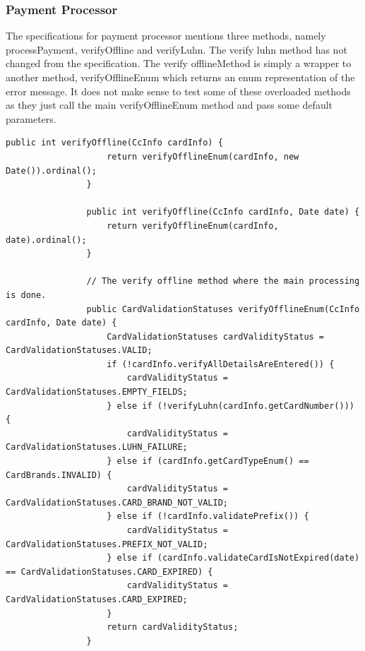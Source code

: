 \documentclass[11pt, a4paper]{article}
\begin{document}
        \subsubsection{Payment Processor}
            The specifications for payment processor mentions three methods, namely processPayment, verifyOffline and verifyLuhn. The verify luhn method has not changed from the specification. The verify offlineMethod is simply a wrapper to another method, verifyOfflineEnum which returns an enum representation of the error message. It does not make sense to test some of these overloaded methods as they just call the main verifyOfflineEnum method and pass some default parameters.
            \begin{lstlisting}[caption=Verify offline overloaded methods]
                public int verifyOffline(CcInfo cardInfo) {
                    return verifyOfflineEnum(cardInfo, new Date()).ordinal();
                }

                public int verifyOffline(CcInfo cardInfo, Date date) {
                    return verifyOfflineEnum(cardInfo, date).ordinal();
                }

                // The verify offline method where the main processing is done.
                public CardValidationStatuses verifyOfflineEnum(CcInfo cardInfo, Date date) {
                    CardValidationStatuses cardValidityStatus = CardValidationStatuses.VALID;
                    if (!cardInfo.verifyAllDetailsAreEntered()) {
                        cardValidityStatus = CardValidationStatuses.EMPTY_FIELDS;
                    } else if (!verifyLuhn(cardInfo.getCardNumber())) {
                        cardValidityStatus = CardValidationStatuses.LUHN_FAILURE;
                    } else if (cardInfo.getCardTypeEnum() == CardBrands.INVALID) {
                        cardValidityStatus = CardValidationStatuses.CARD_BRAND_NOT_VALID;
                    } else if (!cardInfo.validatePrefix()) {
                        cardValidityStatus = CardValidationStatuses.PREFIX_NOT_VALID;
                    } else if (cardInfo.validateCardIsNotExpired(date) == CardValidationStatuses.CARD_EXPIRED) {
                        cardValidityStatus = CardValidationStatuses.CARD_EXPIRED;
                    }
                    return cardValidityStatus;
                }
            \end{lstlisting}
\end{document}
